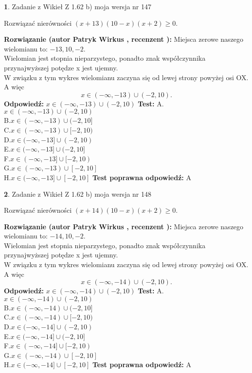 \documentclass[12pt, a4paper]{article}
\theoremstyle{definition} %
\newtheorem{zad}{}
\newcommand{\zadStart}[1]{\begin{zad}#1\newline}
\newcommand{\zadStop}{\end{zad}}
\newcommand{\rozwStart}[2]{\noindent \textbf{Rozwiązanie (autor #1 , recenzent #2): }\newline}
\newcommand{\rozwStop}{\newline}
\newcommand{\odpStart}{\noindent \textbf{Odpowiedź:}\newline}
\newcommand{\odpStop}{\newline}
\newcommand{\testStart}{\noindent \textbf{Test:}\newline}
\newcommand{\testStop}{\newline}
\newcommand{\kluczStart}{\noindent \textbf{Test poprawna odpowiedź:}\newline}
\newcommand{\kluczStop}{\newline}
\begin{document}
\zadStart{Zadanie z Wikieł Z 1.62 b) moja wersja nr 147}

Rozwiązać nierówności $(x+13)(10-x)(x+2)\ge0$.
\zadStop
\rozwStart{Patryk Wirkus}{}
Miejsca zerowe naszego wielomianu to: $-13, 10, -2$.\\
Wielomian jest stopnia nieparzystego, ponadto znak współczynnika przy\linebreak najwyższej potędze x jest ujemny.\\ W związku z tym wykres wielomianu zaczyna się od lewej strony powyżej osi OX. A więc $$x \in (-\infty,-13) \cup (-2,10).$$
\rozwStop
\odpStart
$x \in (-\infty,-13) \cup (-2,10)$
\odpStop
\testStart
A.$x \in (-\infty,-13) \cup (-2,10)$\\
B.$x \in (-\infty,-13) \cup (-2,10]$\\
C.$x \in (-\infty,-13) \cup [-2,10)$\\
D.$x \in (-\infty,-13] \cup (-2,10)$\\
E.$x \in (-\infty,-13] \cup (-2,10]$\\
F.$x \in (-\infty,-13] \cup [-2,10)$\\
G.$x \in (-\infty,-13) \cup [-2,10]$\\
H.$x \in (-\infty,-13] \cup [-2,10]$
\testStop
\kluczStart
A
\kluczStop



\zadStart{Zadanie z Wikieł Z 1.62 b) moja wersja nr 148}

Rozwiązać nierówności $(x+14)(10-x)(x+2)\ge0$.
\zadStop
\rozwStart{Patryk Wirkus}{}
Miejsca zerowe naszego wielomianu to: $-14, 10, -2$.\\
Wielomian jest stopnia nieparzystego, ponadto znak współczynnika przy\linebreak najwyższej potędze x jest ujemny.\\ W związku z tym wykres wielomianu zaczyna się od lewej strony powyżej osi OX. A więc $$x \in (-\infty,-14) \cup (-2,10).$$
\rozwStop
\odpStart
$x \in (-\infty,-14) \cup (-2,10)$
\odpStop
\testStart
A.$x \in (-\infty,-14) \cup (-2,10)$\\
B.$x \in (-\infty,-14) \cup (-2,10]$\\
C.$x \in (-\infty,-14) \cup [-2,10)$\\
D.$x \in (-\infty,-14] \cup (-2,10)$\\
E.$x \in (-\infty,-14] \cup (-2,10]$\\
F.$x \in (-\infty,-14] \cup [-2,10)$\\
G.$x \in (-\infty,-14) \cup [-2,10]$\\
H.$x \in (-\infty,-14] \cup [-2,10]$
\testStop
\kluczStart
A
\kluczStop
\end{document}
